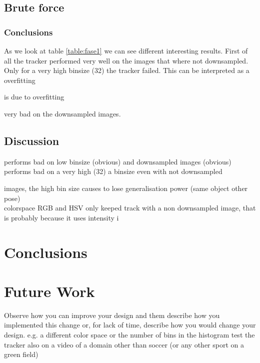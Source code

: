 \documentclass[a4paper,11pt]{article}
\begin{document}
	\subsection{Brute force} 
\subsubsection{Conclusions}
As we look at table \ref{table:fase1} we can see different interesting results.
First of all the tracker performed very well on the images that where not
downsampled. Only for a very high binsize (32) the tracker failed. This can be
interpreted as a overfitting

is due
to overfitting 

very bad on the downsampled images.


\subsection{Discussion} %

performs bad on low binsize (obvious) and downsampled images (obvious)\\
performs bad on a very high (32) a binsize even with not downsampled

images, the high bin size causes to lose generalisation power (same object other pose)\\


colorspace RGB and HSV only keeped track with a non downsampled image,
that is probably because it uses intensity i


\section{Conclusions} \label{sec:conc}
\section{Future Work} \label{sec:fut}

Observe how you can improve your design and them describe how you implemented this change or, for lack of time, describe how you would change your design. 
e.g. a different color space or the number of bins in the histogram
test the tracker also on a video of a domain other than soccer (or any other sport on a green field)
\end{document}

